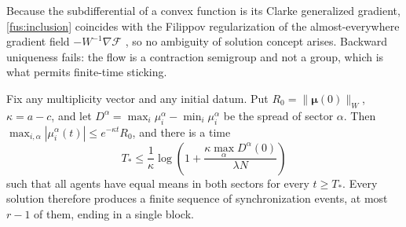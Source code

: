 Because the subdifferential of a convex function is its Clarke generalized
gradient, \cref{fus:inclusion} coincides with the Filippov regularization of
the almost-everywhere gradient field $-W^{-1}\nabla\mathcal F$
\cite{Filippov1988,Clarke1983,PadenSastry1987}, so no ambiguity of solution
concept arises. Backward uniqueness fails: the flow is a contraction
semigroup and not a group, which is what permits finite-time sticking.

Fix any multiplicity vector and any initial datum. Put
$R_0=\|\boldsymbol\mu(0)\|_W$, $\kappa=a-c$, and let
$D^\alpha=\max_i\mu_i^\alpha-\min_i\mu_i^\alpha$ be the spread of sector
$\alpha$. Then $\max_{i,\alpha}|\mu_i^\alpha(t)|\leq e^{-\kappa t}R_0$, and
there is a time
\begin{equation}
 T_*\leq\frac1\kappa\log\left(1+\frac{\kappa\max_\alpha D^\alpha(0)}{\lambda N}\right)
 \label{fus:sync-time}
\end{equation}
such that all agents have equal means in both sectors for every
$t\geq T_*$. Every solution therefore produces a finite sequence of
synchronization events, at most $r-1$ of them, ending in a single block.
